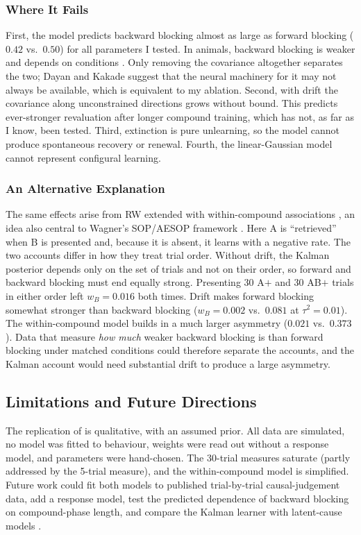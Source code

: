 \documentclass[conference,a4paper]{IEEEtran}
\begin{document}
\subsubsection{Where It Fails}
First, the model predicts backward blocking almost as large as forward blocking
($0.42$ vs.\ $0.50$) for all parameters I tested. In animals, backward blocking is
weaker and depends on conditions \cite{miller1996}. Only removing the covariance
altogether separates the two; Dayan and Kakade \cite{dayan2001} suggest that the
neural machinery for it may not always be available, which is equivalent to my
ablation. Second, with drift the covariance along unconstrained directions grows
without bound. This predicts ever-stronger revaluation after longer compound
training, which has not, as far as I know, been tested. Third, extinction is pure
unlearning, so the model cannot produce spontaneous recovery or renewal. Fourth,
the linear-Gaussian model cannot represent configural learning.

\subsubsection{An Alternative Explanation}
The same effects arise from RW extended with within-compound associations
\cite{vanhamme1994}, an idea also central to Wagner's SOP/AESOP framework
\cite{wagner1989}. Here A is ``retrieved'' when B is presented and, because it is
absent, it learns with a negative rate. The two accounts differ in how they treat
trial order. Without drift, the Kalman posterior depends only on the set of trials
and not on their order, so forward and backward blocking must end equally strong.
Presenting 30 A$+$ and 30 AB$+$ trials in either order left $w_B=0.016$ both
times. Drift makes forward blocking somewhat stronger than backward blocking
($w_B = 0.002$ vs.\ $0.081$ at $\tau^2=0.01$). The within-compound model builds in
a much larger asymmetry ($0.021$ vs.\ $0.373$). Data that measure \emph{how much}
weaker backward blocking is than forward blocking under matched conditions could
therefore separate the accounts, and the Kalman account would need substantial
drift to produce a large asymmetry.

\subsection{Limitations and Future Directions}
The replication of \cite{dayan2001} is qualitative, with an assumed prior. All
data are simulated, no model was fitted to behaviour, weights were read out
without a response model, and parameters were hand-chosen. The 30-trial measures
saturate (partly addressed by the 5-trial measure), and the within-compound
model is simplified. Future work could fit both models to published
trial-by-trial causal-judgement data, add a response model, test the predicted
dependence of backward blocking on compound-phase length, and compare the Kalman
learner with latent-cause models \cite{gershman2015}.
\end{document}
